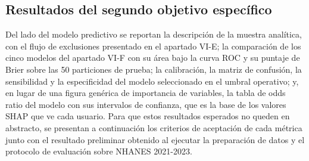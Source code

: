 \documentclass[conference]{IEEEtran}
\begin{document}
\subsection{Resultados del segundo objetivo específico}
Del lado del modelo predictivo se reportan la descripción de la muestra analítica, con el flujo de exclusiones presentado en el apartado VI-E; la comparación de los cinco modelos del apartado VI-F con su área bajo la curva ROC y su puntaje de Brier sobre las 50 particiones de prueba; la calibración, la matriz de confusión, la sensibilidad y la especificidad del modelo seleccionado en el umbral operativo; y, en lugar de una figura genérica de importancia de variables, la tabla de odds ratio del modelo con sus intervalos de confianza, que es la base de los valores SHAP que ve cada usuario. Para que estos resultados esperados no queden en abstracto, se presentan a continuación los criterios de aceptación de cada métrica junto con el resultado preliminar obtenido al ejecutar la preparación de datos y el protocolo de evaluación sobre NHANES 2021-2023.
\end{document}
